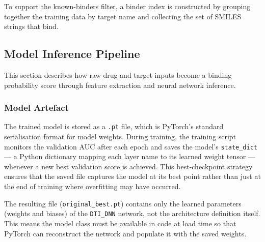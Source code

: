 To support the known-binders filter, a binder index is constructed by grouping together the training data by target name and collecting the set of SMILES strings that bind.
\subsection{Model Inference Pipeline}
This section describes how raw drug and target inputs become a binding probability score through feature extraction and neural network inference.

\subsubsection{Model Artefact}
The trained model is stored as a \texttt{.pt} file, which is PyTorch's standard serialisation format for model weights.
During training, the training script monitors the validation AUC after each epoch and saves the model's \texttt{state\_dict} --- a Python dictionary mapping each layer name to its learned weight tensor --- whenever a new best validation score is achieved.
This best-checkpoint strategy ensures that the saved file captures the model at its best point rather than just at the end of training where overfitting may have occurred.

The resulting file (\texttt{original\_best.pt}) contains only the learned parameters (weights and biases) of the \texttt{DTI\_DNN} network, not the architecture definition itself.
This means the model class must be available in code at load time so that PyTorch can reconstruct the network and populate it with the saved weights.

